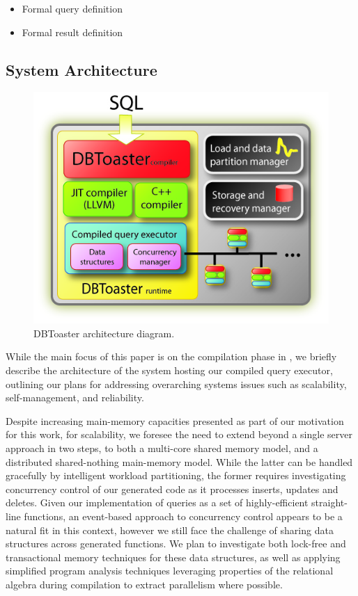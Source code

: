 \begin{itemize}
  \item Formal query definition
  \item Formal result definition
\end{itemize}
  
\subsection{System Architecture}
\begin{figure}
\begin{center}
\includegraphics[scale=0.45]{figures/overview}
\end{center}
\caption{DBToaster architecture diagram.}
\label{fig:overview}
\end{figure}

While the main focus of this paper is on the compilation phase in \compiler, we
briefly describe the architecture of the system hosting our compiled
query executor, outlining our plans for addressing overarching systems issues
such as scalability, self-management, and reliability.

Despite increasing main-memory capacities presented as part of our motivation for
this work, for scalability, we foresee the need to extend beyond a single server
approach in two steps, to both a multi-core shared memory model, and a
distributed shared-nothing main-memory model. While the latter can be handled
gracefully by intelligent workload partitioning, the former requires
investigating concurrency control of our generated code as it processes inserts,
updates and deletes. Given our implementation of queries as a set of
highly-efficient straight-line functions, an event-based approach to concurrency
control appears to be a natural fit in this context, however we still face the
challenge of sharing data structures across generated functions. We plan to
investigate both lock-free and transactional memory techniques for these data
structures, as well as applying simplified program analysis techniques leveraging
properties of the relational algebra during compilation to extract parallelism
where possible.

